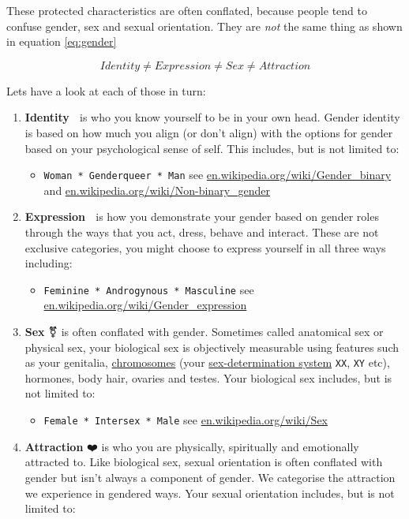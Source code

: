 \documentclass[
]{book}
\providecommand{\tightlist}{%
  \setlength{\itemsep}{0pt}\setlength{\parskip}{0pt}}
\begin{document}
These protected characteristics are often conflated, because people tend to confuse gender, sex and sexual orientation. They are \emph{not} the same thing as shown in equation \eqref{eq:gender}

\begin{equation}
Identity ≠ Expression ≠ Sex ≠ Attraction
  \label{eq:gender}
\end{equation}

Lets have a look at each of those in turn:

\begin{enumerate}
\def\labelenumi{\arabic{enumi}.}
\tightlist
\item
  \textbf{Identity} 🧠 is who you know yourself to be in your own head. Gender identity is based on how much you align (or don't align) with the options for gender based on your psychological sense of self. This includes, but is not limited to:

  \begin{itemize}
  \tightlist
  \item
    \texttt{Woman\ *\ Genderqueer\ *\ Man} see \href{https://en.wikipedia.org/wiki/Gender_binary}{en.wikipedia.org/wiki/Gender\_binary} and \href{https://en.wikipedia.org/wiki/Non-binary_gender}{en.wikipedia.org/wiki/Non-binary\_gender}
  \end{itemize}
\item
  \textbf{Expression} 🎨 is how you demonstrate your gender based on gender roles through the ways that you act, dress, behave and interact. These are not exclusive categories, you might choose to express yourself in all three ways including:

  \begin{itemize}
  \tightlist
  \item
    \texttt{Feminine\ *\ Androgynous\ *\ Masculine} see \href{https://en.wikipedia.org/wiki/Gender_expression}{en.wikipedia.org/wiki/Gender\_expression}
  \end{itemize}
\item
  \textbf{Sex} ⚧️ is often conflated with gender. Sometimes called anatomical sex or physical sex, your biological sex is objectively measurable using features such as your genitalia, \href{https://en.wikipedia.org/wiki/Chromosome}{chromosomes} (your \href{https://en.wikipedia.org/wiki/Sex-determination_system}{sex-determination system} \texttt{XX}, \texttt{XY} etc), hormones, body hair, ovaries and testes. Your biological sex includes, but is not limited to:

  \begin{itemize}
  \tightlist
  \item
    \texttt{Female\ *\ Intersex\ *\ Male} see \href{https://en.wikipedia.org/wiki/Sex}{en.wikipedia.org/wiki/Sex}
  \end{itemize}
\item
  \textbf{Attraction} ❤️ is who you are physically, spiritually and emotionally attracted to. Like biological sex, sexual orientation is often conflated with gender but isn't always a component of gender. We categorise the attraction we experience in gendered ways. Your sexual orientation includes, but is not limited to:


\end{enumerate}
\end{document}
